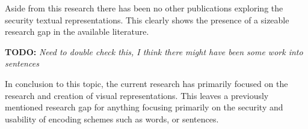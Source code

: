 Aside from this research there has been no other publications exploring the security textual representations. This clearly shows the presence of a sizeable research gap in the available literature.

{\small \textbf{TODO: } \textit{Need to double check this, I think there might have been some work into sentences}}

In conclusion to this topic, the current research has primarily focused on the research and creation of visual representations. This leaves a previously mentioned research gap for anything focusing primarily on the security and usability of encoding schemes such as words, or sentences.